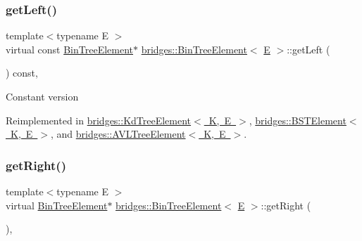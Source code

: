 \mbox{\label{classbridges_1_1_bin_tree_element_a0841701bd7d4b444dafbbdfefed067a5}} 
\subsubsection{\texorpdfstring{getLeft()}{getLeft()}\hspace{0.1cm}{\footnotesize\ttfamily [2/2]}}
{\footnotesize\ttfamily template$<$typename E $>$ \\
virtual const \mbox{\hyperlink{classbridges_1_1_bin_tree_element}{Bin\+Tree\+Element}}$\ast$ \mbox{\hyperlink{classbridges_1_1_bin_tree_element}{bridges\+::\+Bin\+Tree\+Element}}$<$ \mbox{\hyperlink{namespacebridges_acfb0a4f7877d8f63de3e6862004c50eda3a3ea00cfc35332cedf6e5e9a32e94da}{E}} $>$\+::get\+Left (\begin{DoxyParamCaption}{ }\end{DoxyParamCaption}) const\hspace{0.3cm}{\ttfamily [inline]}, {\ttfamily [virtual]}}

Constant version 

Reimplemented in \mbox{\hyperlink{classbridges_1_1_kd_tree_element_ab58af4ca67cb3869c279bfc11952c070}{bridges\+::\+Kd\+Tree\+Element$<$ K, E $>$}}, \mbox{\hyperlink{classbridges_1_1_b_s_t_element_a2abcfb991f6cc377da2bd9217319fc9c}{bridges\+::\+B\+S\+T\+Element$<$ K, E $>$}}, and \mbox{\hyperlink{classbridges_1_1_a_v_l_tree_element_a61e075db5414b7bd6f52d657401acda3}{bridges\+::\+A\+V\+L\+Tree\+Element$<$ K, E $>$}}.

\mbox{\label{classbridges_1_1_bin_tree_element_a5751f2fe38e2364f68dc37939fce060f}} 
\subsubsection{\texorpdfstring{getRight()}{getRight()}\hspace{0.1cm}{\footnotesize\ttfamily [1/2]}}
{\footnotesize\ttfamily template$<$typename E $>$ \\
virtual \mbox{\hyperlink{classbridges_1_1_bin_tree_element}{Bin\+Tree\+Element}}$\ast$ \mbox{\hyperlink{classbridges_1_1_bin_tree_element}{bridges\+::\+Bin\+Tree\+Element}}$<$ \mbox{\hyperlink{namespacebridges_acfb0a4f7877d8f63de3e6862004c50eda3a3ea00cfc35332cedf6e5e9a32e94da}{E}} $>$\+::get\+Right (\begin{DoxyParamCaption}{ }\end{DoxyParamCaption})\hspace{0.3cm}{\ttfamily [inline]}, {\ttfamily [virtual]}}

